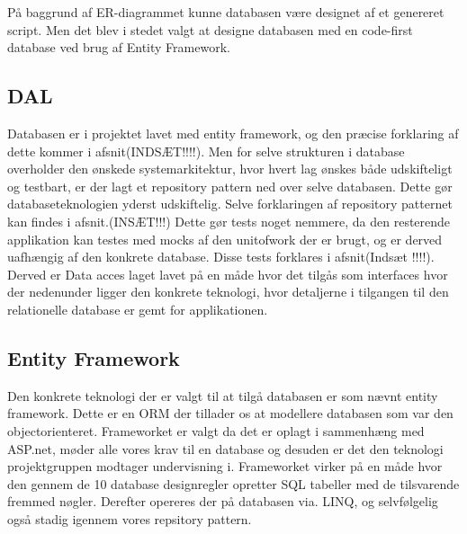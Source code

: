 På baggrund af ER-diagrammet kunne databasen være designet af et genereret script. Men det blev i stedet valgt at designe databasen med en code-first database ved brug af Entity Framework.



\subsection{DAL} 
Databasen er i projektet lavet med entity framework, og den præcise forklaring af dette kommer i afsnit(INDSÆT!!!!). Men for selve strukturen i database overholder den ønskede systemarkitektur, hvor hvert lag ønskes både udskifteligt og testbart, er der lagt et repository pattern ned over selve databasen. Dette gør databaseteknologien yderst udskiftelig. Selve forklaringen af repository patternet kan findes i afsnit.(INSÆT!!!) Dette gør tests noget nemmere, da den resterende applikation kan testes med mocks af den unitofwork der er brugt, og er derved uafhængig af den konkrete database. Disse tests forklares i afsnit(Indsæt !!!!). Derved er Data acces laget lavet på en måde hvor det tilgås som interfaces hvor der nedenunder ligger den konkrete teknologi, hvor detaljerne i tilgangen til den relationelle database er gemt for applikationen.      

\subsection{Entity Framework}
Den konkrete teknologi der er valgt til at tilgå databasen er som nævnt entity framework. Dette er en ORM der tillader os at modellere databasen som var den objectorienteret. Frameworket er valgt da det er oplagt i sammenhæng med ASP.net, møder alle vores krav til en database og desuden er det den teknologi projektgruppen modtager undervisning i. Frameworket virker på en måde hvor den gennem de 10 database designregler opretter SQL tabeller med de tilsvarende fremmed nøgler. Derefter  opereres der på databasen via. LINQ, og selvfølgelig også stadig igennem vores repsitory pattern.      